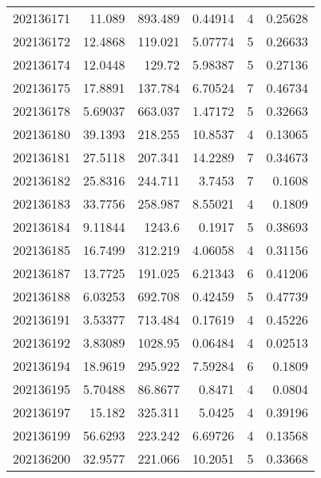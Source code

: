 \begin{tabular}{rrrrrr}
 202136171 &         11.089   &      893.489  &            0.44914 &           4 & 0.25628 \\
 202136172 &         12.4868  &      119.021  &            5.07774 &           5 & 0.26633 \\
 202136174 &         12.0448  &      129.72   &            5.98387 &           5 & 0.27136 \\
 202136175 &         17.8891  &      137.784  &            6.70524 &           7 & 0.46734 \\
 202136178 &          5.69037 &      663.037  &            1.47172 &           5 & 0.32663 \\
 202136180 &         39.1393  &      218.255  &           10.8537  &           4 & 0.13065 \\
 202136181 &         27.5118  &      207.341  &           14.2289  &           7 & 0.34673 \\
 202136182 &         25.8316  &      244.711  &            3.7453  &           7 & 0.1608  \\
 202136183 &         33.7756  &      258.987  &            8.55021 &           4 & 0.1809  \\
 202136184 &          9.11844 &     1243.6    &            0.1917  &           5 & 0.38693 \\
 202136185 &         16.7499  &      312.219  &            4.06058 &           4 & 0.31156 \\
 202136187 &         13.7725  &      191.025  &            6.21343 &           6 & 0.41206 \\
 202136188 &          6.03253 &      692.708  &            0.42459 &           5 & 0.47739 \\
 202136191 &          3.53377 &      713.484  &            0.17619 &           4 & 0.45226 \\
 202136192 &          3.83089 &     1028.95   &            0.06484 &           4 & 0.02513 \\
 202136194 &         18.9619  &      295.922  &            7.59284 &           6 & 0.1809  \\
 202136195 &          5.70488 &       86.8677 &            0.8471  &           4 & 0.0804  \\
 202136197 &         15.182   &      325.311  &            5.0425  &           4 & 0.39196 \\
 202136199 &         56.6293  &      223.242  &            6.69726 &           4 & 0.13568 \\
 202136200 &         32.9577  &      221.066  &           10.2051  &           5 & 0.33668 \\

\end{tabular}
